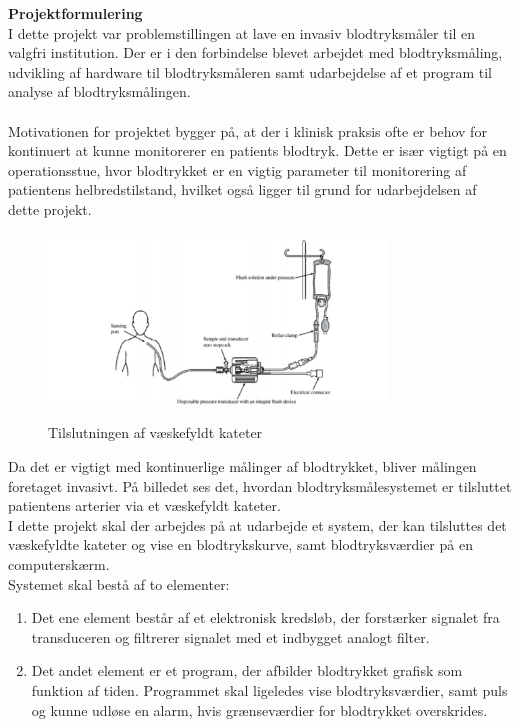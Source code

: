 \textbf{Projektformulering}\\
I dette projekt var problemstillingen at lave en invasiv blodtryksmåler til en valgfri institution. Der er i den forbindelse blevet arbejdet med blodtryksmåling, udvikling af hardware til blodtryksmåleren samt udarbejdelse af et program til analyse af blodtryksmålingen.\\ 
\\
Motivationen for projektet bygger på, at der i klinisk praksis ofte er behov for kontinuert at kunne monitorerer en patients blodtryk. Dette er især vigtigt på en operationsstue, hvor blodtrykket er en vigtig parameter til monitorering af patientens helbredstilstand, hvilket også ligger til grund for udarbejdelsen af dette projekt.\\
\begin{figure}[H]
	\centering
	\includegraphics[width=0.8\textwidth]{Figurer/Indledning/Opstilling}
	\label{Opstilling}
	\caption{Tilslutningen af væskefyldt kateter}
\end{figure}
Da det er vigtigt med kontinuerlige målinger af blodtrykket, bliver målingen foretaget invasivt. På billedet ses det, hvordan blodtryksmålesystemet er tilsluttet patientens arterier via et væskefyldt kateter.\\ 
I dette projekt skal der arbejdes på at udarbejde et system, der kan tilsluttes det væskefyldte kateter og vise en blodtrykskurve, samt blodtryksværdier på en computerskærm. \\
Systemet skal bestå af to elementer:
\begin{enumerate}
	\item Det ene element består af et elektronisk kredsløb, der forstærker signalet fra transduceren og filtrerer signalet med et indbygget analogt filter.
	\item Det andet element er et program, der afbilder blodtrykket grafisk som funktion af tiden. Programmet skal ligeledes vise blodtryksværdier, samt puls og kunne udløse en alarm, hvis grænseværdier for blodtrykket overskrides. 
\end{enumerate}
